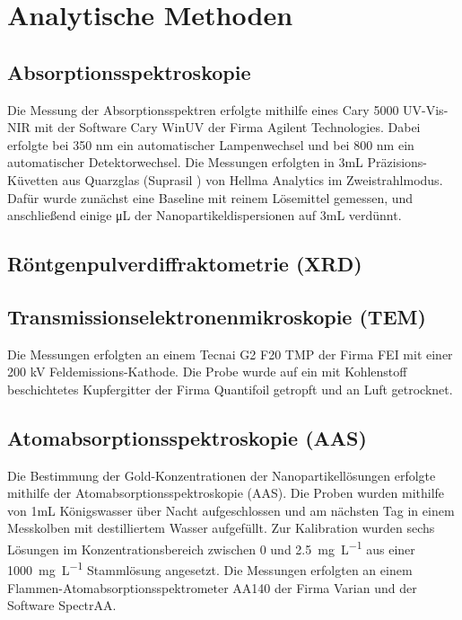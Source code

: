 \section{Analytische Methoden}

\subsection{Absorptionsspektroskopie}
	Die Messung der Absorptionsspektren erfolgte mithilfe eines Cary 5000 UV-Vis-NIR mit
	der Software Cary WinUV der Firma Agilent Technologies. 
	Dabei erfolgte bei 350 nm ein automatischer Lampenwechsel und bei 800 nm ein automatischer Detektorwechsel.
	Die	Messungen erfolgten in 3mL Präzisions-Küvetten aus Quarzglas (Suprasil \textregistered) von Hellma	Analytics im Zweistrahlmodus. 
	Dafür wurde zunächst eine Baseline mit reinem Lösemittel gemessen, und anschließend einige \si{\micro\liter} der Nanopartikeldispersionen auf 3mL verdünnt.

\subsection{Röntgenpulverdiffraktometrie (XRD)}
	
\subsection{Transmissionselektronenmikroskopie (TEM)}
	Die Messungen erfolgten an einem Tecnai G2 F20 TMP der Firma FEI mit einer 200 kV
	Feldemissions-Kathode. 
	Die Probe wurde auf ein mit Kohlenstoff beschichtetes Kupfergitter der Firma
	Quantifoil getropft und an Luft getrocknet.


\subsection{Atomabsorptionsspektroskopie (AAS)}
	Die Bestimmung der Gold-Konzentrationen der Nanopartikellösungen erfolgte mithilfe
	der Atomabsorptionsspektroskopie (AAS). 
	Die Proben wurden mithilfe von 1mL Königswasser über Nacht aufgeschlossen und am
	nächsten Tag in einem Messkolben mit destilliertem Wasser aufgefüllt. Zur Kalibration wurden sechs Lösungen im Konzentrationsbereich zwischen 0 und \SI{2,5}{\milli\gram\liter\tothe{-1}} aus einer
	\SI{1000}{\milli\gram\liter\tothe{-1}} Stammlösung angesetzt.
	Die Messungen erfolgten an einem Flammen-Atomabsorptionsspektrometer AA140 der
	Firma Varian und der Software SpectrAA.